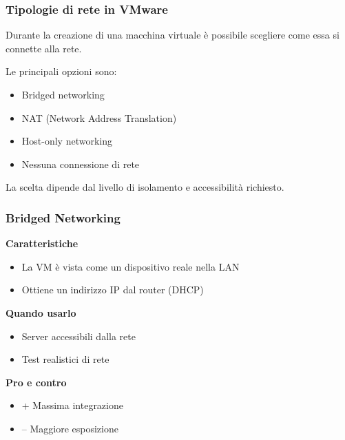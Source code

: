 \documentclass{beamer}
\begin{document}
	\begin{frame}
		\frametitle{Tipologie di rete in VMware}
		
		Durante la creazione di una macchina virtuale è possibile scegliere 
		come essa si connette alla rete.
		
		\vspace{0.5cm}
		
		Le principali opzioni sono:
		
		\begin{itemize}
			\item Bridged networking
			\item NAT (Network Address Translation)
			\item Host-only networking
			\item Nessuna connessione di rete
		\end{itemize}
		
		\vspace{0.5cm}
		
		La scelta dipende dal livello di isolamento e accessibilità richiesto.
	\end{frame}
	
	
	\begin{frame}
		\frametitle{Bridged Networking}
		
		\textbf{Caratteristiche}
		\begin{itemize}
			\item La VM è vista come un dispositivo reale nella LAN
			\item Ottiene un indirizzo IP dal router (DHCP)
		\end{itemize}
		
		\vspace{0.4cm}
		
		\textbf{Quando usarlo}
		\begin{itemize}
			\item Server accessibili dalla rete
			\item Test realistici di rete
		\end{itemize}
		
		\vspace{0.4cm}
		
		\textbf{Pro e contro}
		\begin{itemize}
			\item + Massima integrazione
			\item -- Maggiore esposizione
		\end{itemize}
		
	\end{frame}
	
\end{document}

